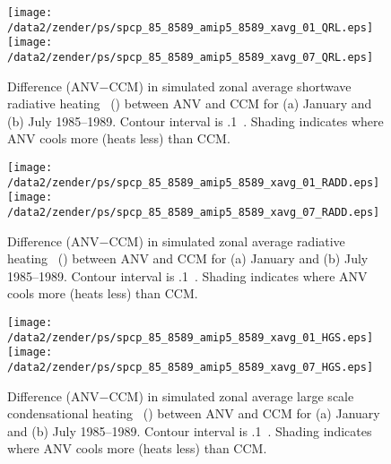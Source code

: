 \documentclass[twocolumn,final]{article}
\begin{document}
\begin{figure}
\begin{center}
\texttt{[image: /data2/zender/ps/spcp\_85\_8589\_amip5\_8589\_xavg\_01\_QRL.eps]}\vfill
\texttt{[image: /data2/zender/ps/spcp\_85\_8589\_amip5\_8589\_xavg\_07\_QRL.eps]}\vfill
\end{center}
\caption[Difference (ANV$-$CCM) in simulated zonal average longwave
radiative heating \QRL\ between ANV and CCM for January and
July 1985--1989]{
Difference (ANV$-$CCM) in simulated zonal average shortwave radiative
heating \QR\ (\kxday) between ANV and CCM for (a) January and (b) July
1985--1989. 
Contour interval is .1~\kxday. 
Shading indicates where ANV cools more (heats less) than CCM. 
\label{fig:xavg_8589_QRL}}   
\end{figure}
\clearpage

\begin{figure}
\begin{center}
\texttt{[image: /data2/zender/ps/spcp\_85\_8589\_amip5\_8589\_xavg\_01\_RADD.eps]}\vfill
\texttt{[image: /data2/zender/ps/spcp\_85\_8589\_amip5\_8589\_xavg\_07\_RADD.eps]}\vfill
\end{center}
\caption[Difference (ANV$-$CCM) in simulated zonal average radiative
heating \QR\ between ANV and CCM for January and July
1985--1989]{
Difference (ANV$-$CCM) in simulated zonal average radiative heating
\QR\ (\kxday) between ANV and CCM for (a) January and (b) July
1985--1989. 
Contour interval is .1~\kxday. 
Shading indicates where ANV cools more (heats less) than CCM. 
\label{fig:xavg_8589_RADD}}   
\end{figure}

\begin{figure}
\begin{center}
\texttt{[image: /data2/zender/ps/spcp\_85\_8589\_amip5\_8589\_xavg\_01\_HGS.eps]}\vfill
\texttt{[image: /data2/zender/ps/spcp\_85\_8589\_amip5\_8589\_xavg\_07\_HGS.eps]}\vfill
\end{center}
\caption[Difference (ANV$-$CCM) in simulated zonal average large scale
condensational heating \QL\ between ANV and CCM for January
and July 1985--1989]{
Difference (ANV$-$CCM) in simulated zonal average large scale
condensational heating \QL\ (\kxday) between ANV and CCM for (a)
January and (b) July 1985--1989. 
Contour interval is .1~\kxday. 
Shading indicates where ANV cools more (heats less) than CCM. 
\label{fig:xavg_8589_HGS}}   
\end{figure}
\end{document}
